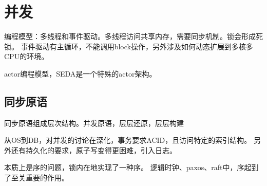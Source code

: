 \chapter{并发}

编程模型：多线程和事件驱动。多线程访问共享内存，需要同步机制。锁会形成死锁。
事件驱动有主循环，不能调用block操作，另外涉及如何动态扩展到多核多CPU的环境。

actor编程模型，SEDA是一个特殊的actor架构。

\section{同步原语}

同步原语组成层次结构。并发原语，层层还原，层层构建

从OS到DB，对并发的讨论在深化，事务要求ACID，且访问特定的索引结构。
另外还有持久化的要求，原子写变得更困难，引入日志。

本质上是序的问题，锁内在地实现了一种序。
逻辑时钟、paxos、raft中，序起到了至关重要的作用。
